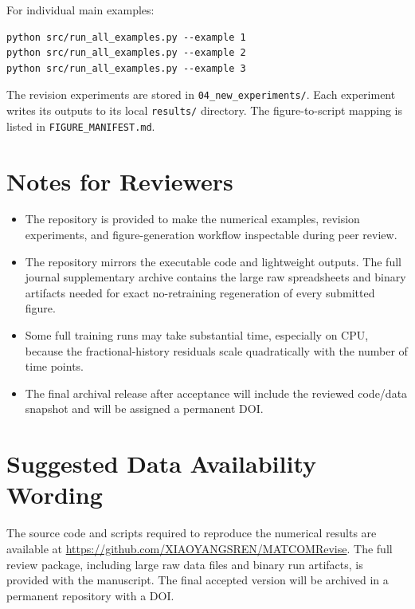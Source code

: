 \documentclass[11pt]{article}
\begin{document}
For individual main examples:

\begin{verbatim}
python src/run_all_examples.py --example 1
python src/run_all_examples.py --example 2
python src/run_all_examples.py --example 3
\end{verbatim}

The revision experiments are stored in \texttt{04\_new\_experiments/}. Each experiment writes its outputs to its local \texttt{results/} directory. The figure-to-script mapping is listed in \texttt{FIGURE\_MANIFEST.md}.

\section*{Notes for Reviewers}

\begin{itemize}[leftmargin=*]
\item The repository is provided to make the numerical examples, revision experiments, and figure-generation workflow inspectable during peer review.
\item The repository mirrors the executable code and lightweight outputs. The full journal supplementary archive contains the large raw spreadsheets and binary artifacts needed for exact no-retraining regeneration of every submitted figure.
\item Some full training runs may take substantial time, especially on CPU, because the fractional-history residuals scale quadratically with the number of time points.
\item The final archival release after acceptance will include the reviewed code/data snapshot and will be assigned a permanent DOI.
\end{itemize}

\section*{Suggested Data Availability Wording}

The source code and scripts required to reproduce the numerical results are available at \url{https://github.com/XIAOYANGSREN/MATCOMRevise}. The full review package, including large raw data files and binary run artifacts, is provided with the manuscript. The final accepted version will be archived in a permanent repository with a DOI.
\end{document}
